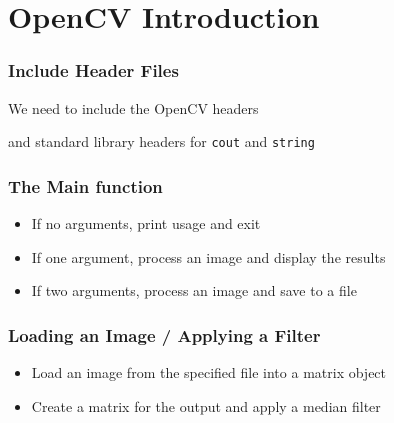 \section{OpenCV Introduction}






\begin{frame}
\frametitle{Include Header Files}
\begin{center}
We need to include the OpenCV headers

\pause
\vspace{1 em}
and standard library headers for {\tt cout} and {\tt string}

\end{center}

\end{frame}


\begin{frame}
\frametitle{The Main function}
\begin{center}

\begin{itemize}
\item If no arguments, print usage and exit
\item If one argument, process an image and display the results
\item If two arguments, process an image and save to a file
\end{itemize}
\end{center}

\end{frame}


\begin{frame}
\frametitle{Loading an Image / Applying a Filter}
\begin{center}
\begin{itemize}
\item Load an image from the specified file into a matrix object
\end{itemize}

\pause
\begin{itemize}
\item Create a matrix for the output and apply a median filter
\end{itemize}

\end{center}

\end{frame}
